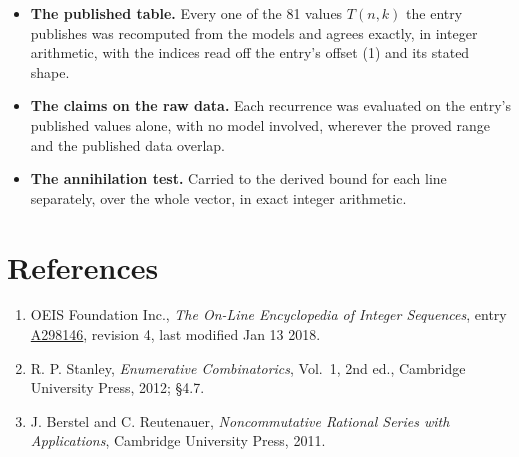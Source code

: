 \documentclass[11pt]{article}
\theoremstyle{definition}
\begin{document}
\begin{itemize}

\item {\bfseries The published table.} Every one of the 81 values $T(n,k)$ the entry publishes was recomputed from the models and agrees exactly, in integer arithmetic, with the indices read off the entry's offset (1) and its stated shape.

\item {\bfseries The claims on the raw data.} Each recurrence was evaluated on the entry's published values alone, with no model involved, wherever the proved range and the published data overlap.

\item {\bfseries The annihilation test.} Carried to the derived bound for each line separately, over the whole vector, in exact integer arithmetic.

\end{itemize}

\section{References}

\begin{enumerate}

\item OEIS Foundation Inc., \emph{The On-Line Encyclopedia of Integer Sequences}, entry \href{https://oeis.org/A298146}{A298146}, revision 4, last modified Jan 13 2018.

\item R. P. Stanley, \emph{Enumerative Combinatorics}, Vol.~1, 2nd ed., Cambridge University Press, 2012; \S4.7.

\item J. Berstel and C. Reutenauer, \emph{Noncommutative Rational Series with Applications}, Cambridge University Press, 2011.

\end{enumerate}
\end{document}
